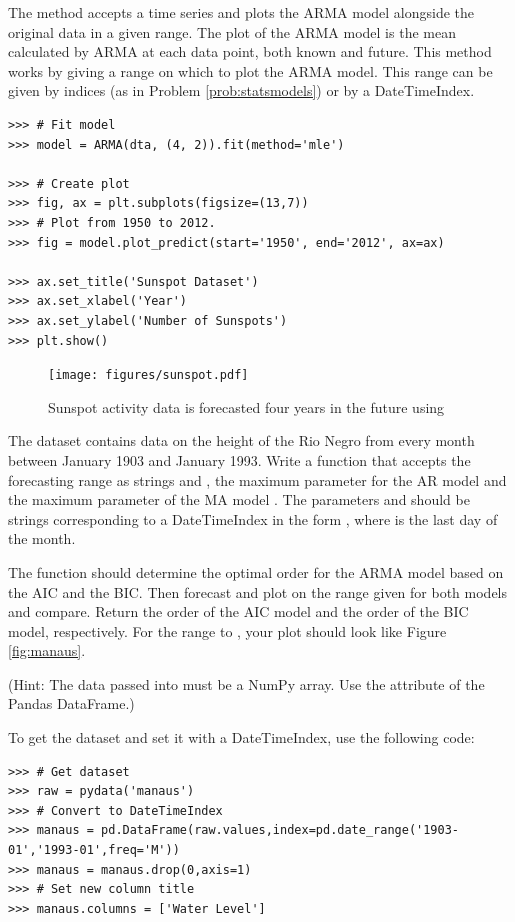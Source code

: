 The method  accepts a time series and plots the ARMA model alongside the original data in a given range.
The plot of the ARMA model is the mean calculated by ARMA at each data point, both known and future.
This method works by giving a range on which to plot the ARMA model.
This range can be given by indices (as in Problem \ref{prob:statsmodels}) or by a DateTimeIndex.

\begin{lstlisting}
>>> # Fit model
>>> model = ARMA(dta, (4, 2)).fit(method='mle')

>>> # Create plot
>>> fig, ax = plt.subplots(figsize=(13,7))
>>> # Plot from 1950 to 2012.
>>> fig = model.plot_predict(start='1950', end='2012', ax=ax)

>>> ax.set_title('Sunspot Dataset')
>>> ax.set_xlabel('Year')
>>> ax.set_ylabel('Number of Sunspots')
>>> plt.show()
\end{lstlisting}

\begin{figure}[H]
\centering
\texttt{[image: figures/sunspot.pdf]}
\caption{Sunspot activity data is forecasted four years in the future using }
\label{fig:sunspot}
\end{figure}

\begin{problem}
The dataset  contains data on the height of the Rio Negro from every month between January 1903 and January 1993.
Write a function  that accepts the forecasting range as strings  and , the maximum parameter for the AR model  and the maximum parameter of the MA model .
The parameters  and  should be strings corresponding to a DateTimeIndex in the form , where  is the last day of the month.

The function should determine the optimal order for the ARMA model based on the AIC and the BIC.
Then forecast and plot on the range given for both models and compare.
Return the order of the AIC model and the order of the BIC model, respectively.
For the range  to , your plot should look like Figure \ref{fig:manaus}.

(Hint: The data passed into  must be a NumPy array. Use the attribute  of the Pandas DataFrame.)

To get the  dataset and set it with a DateTimeIndex, use the following code:
\begin{lstlisting}
>>> # Get dataset
>>> raw = pydata('manaus')
>>> # Convert to DateTimeIndex
>>> manaus = pd.DataFrame(raw.values,index=pd.date_range('1903-01','1993-01',freq='M'))
>>> manaus = manaus.drop(0,axis=1)
>>> # Set new column title
>>> manaus.columns = ['Water Level']
\end{lstlisting}
\label{prob:manaus}
\end{problem}

